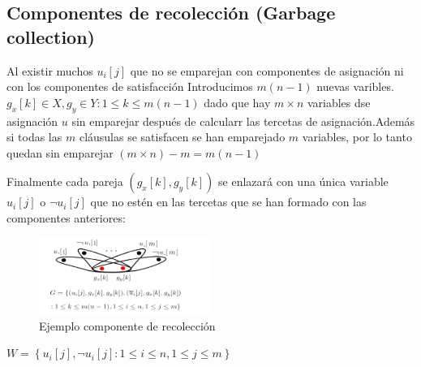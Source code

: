 \documentclass{article}
\begin{document}
\subsection{Componentes de recolección (Garbage collection)}
Al existir muchos $u_i[j]$ que no se emparejan con componentes de asignación ni con los componentes de satisfacción
Introducimos $m(n-1)$ nuevas varibles.
$g_x[k] \in X, g_y \in Y : 1\leq k \leq m(n-1)$ dado que
hay $m \times n$ variables dse asignación $u$ sin emparejar después de calcularr las tercetas de asignación.Además si todas las $m$ cláusulas
se satisfacen se han emparejado $m$ variables, por lo tanto quedan sin emparejar $(m \times n) - m = m(n-1)$


Finalmente cada pareja $(g_x[k], g_y[k])$ se enlazará con una única variable $u_i[j]$ o $\lnot u_i[j]$ que no estén en las tercetas que se han formado con las componentes anteriores:

\begin{figure}[H]
    \centering
    \includegraphics[width=0.5\textwidth]{photos/Ejemplo_garbage_componente.png}
    \caption{Ejemplo componente de recolección}
    \label{fig:etiqueta}
\end{figure}

$W = \left\lbrace u_{i}\left[j\right], \lnot u_{i}\left[j\right] : 1 \leq i \leq n, 1 \leq j \leq m \right\rbrace$
\end{document}
